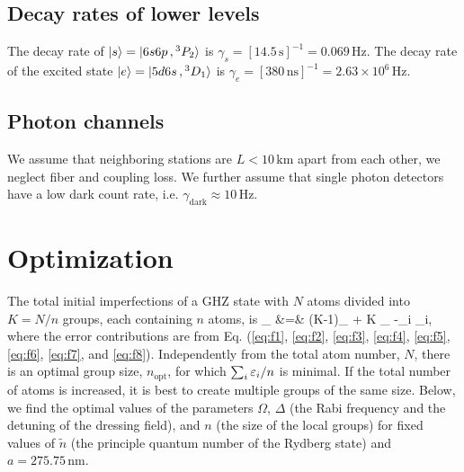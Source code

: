 \subsection{Decay rates of lower levels}
The decay rate of $| s \rangle =| 6s6p\,,{}^3P_2 \rangle$ is $\gamma_s = 
[14.5\,\mathrm{s}]^{-1} = 0.069\,\mathrm{Hz}$. The decay rate of the excited state
$| e \rangle = | 5d6s\,,{}^3D_1 \rangle$ is $\gamma_e  = [380\,\mathrm{ns}]^{-1} = 
2.63\times 10^6\,\mathrm{Hz}$.


\subsection{Photon channels}
We assume that neighboring stations are $L < 10\,\mathrm{km}$ apart from each
other, we neglect fiber and coupling loss. We further assume that single photon
detectors have a low dark count rate, i.e.
$\gamma_\mathrm{dark}\approx 10\,\mathrm{Hz}$.


\section{Optimization}
\label{app:optimization}
The total initial imperfections of a GHZ state with $N$ atoms divided into $K =
N/n$ groups, each containing $n$ atoms, is
\bal
	\eps_ &=& (K-1)\eps_
	+ K \eps_ \approx -\sum_i \eps_i,
\eal
where the error contributions are from Eq. (\ref{eq:f1}, \ref{eq:f2},
\ref{eq:f3}, \ref{eq:f4}, \ref{eq:f5}, \ref{eq:f6}, \ref{eq:f7},
 and \ref{eq:f8}). 
Independently from the total atom number, $N$, there is an optimal group size,
$n_\mathrm{opt}$, for which $\sum_i\varepsilon_i / n$ is minimal. If the total number of
atoms is increased, it is best to create multiple groups of the same size.
Below, we find the optimal values of the parameters $\Omega$, $\Delta$ (the Rabi
frequency and the detuning of the dressing field), and $n$ (the size of the
local groups) for fixed values of $\tilde n$ (the principle quantum number of
the Rydberg state) and  $a = 275.75\,\mathrm{nm}$.

